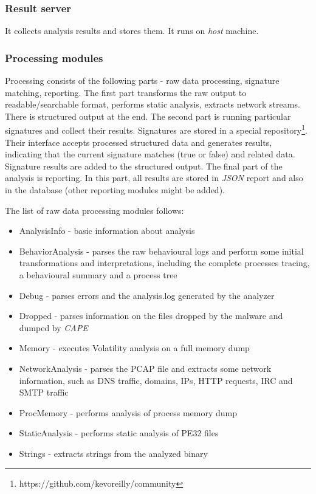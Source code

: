 \subsubsection*{Result server}
It collects analysis results and stores them. It runs on \emph{host} machine.

\subsubsection*{Processing modules}
Processing consists of the following parts - raw data processing, signature matching, reporting. The first part transforms the raw output to readable/searchable format, performs static analysis, extracts network streams. There is structured output at the end. The second part is running particular signatures and collect their results. Signatures are stored in a special repository\footnote{https://github.com/kevoreilly/community}. Their interface accepts processed structured data and generates results, indicating that the current signature matches (true or false) and related data. Signature results are added to the structured output. The final part of the analysis is reporting. In this part, all results are stored in \emph{JSON} report and also in the database (other reporting modules might be added).

The list of raw data processing modules follows:
\begin{itemize}
  \itemsep0em 
  \item AnalysisInfo - basic information about analysis
  \item BehaviorAnalysis - parses the raw behavioural logs and perform some initial transformations and interpretations, including the complete processes tracing, a behavioural summary and a process tree
  \item Debug - parses errors and the analysis.log generated by the analyzer
  \item Dropped - parses information on the files dropped by the malware and dumped by \emph{CAPE}
  \item Memory - executes Volatility analysis on a full memory dump
  \item NetworkAnalysis - parses the PCAP file and extracts some network information, such as DNS traffic, domains, IPs, HTTP requests, IRC and SMTP traffic
  \item ProcMemory - performs analysis of process memory dump
  \item StaticAnalysis - performs static analysis of PE32 files
  \item Strings - extracts strings from the analyzed binary
\end{itemize}

